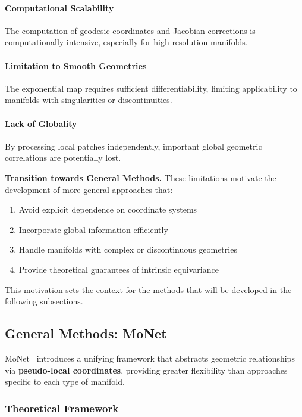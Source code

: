 \paragraph{Computational Scalability}
The computation of geodesic coordinates and Jacobian corrections is computationally intensive, especially for high-resolution manifolds.

\paragraph{Limitation to Smooth Geometries}
The exponential map requires sufficient differentiability, limiting applicability to manifolds with singularities or discontinuities.

\paragraph{Lack of Globality}
By processing local patches independently, important global geometric correlations are potentially lost.

\textbf{Transition towards General Methods.} These limitations motivate the development of more general approaches that:
\begin{enumerate}
    \item Avoid explicit dependence on coordinate systems
    \item Incorporate global information efficiently
    \item Handle manifolds with complex or discontinuous geometries
    \item Provide theoretical guarantees of intrinsic equivariance
\end{enumerate}
This motivation sets the context for the methods that will be developed in the following subsections.

\subsection{General Methods: MoNet}\label{subsec:monet}

MoNet~\citep{DBLP:journals/corr/MontiBMRSB16} introduces a unifying framework that abstracts geometric relationships via \textbf{pseudo-local coordinates}, providing greater flexibility than approaches specific to each type of manifold.

\subsubsection{Theoretical Framework}

